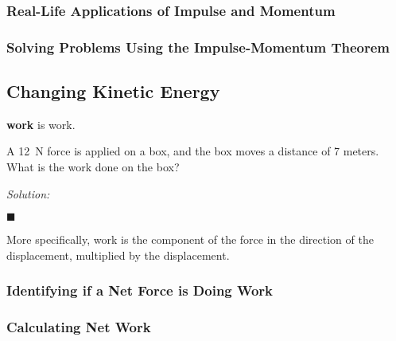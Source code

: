 \documentclass[dvipsnames]{article}
\begin{document}
\subsubsection{Real-Life Applications of Impulse and Momentum}

\subsubsection{Solving Problems Using the Impulse-Momentum Theorem}

\subsection{Changing Kinetic Energy}

\begin{center}
\end{center}

\textbf{\Gls{work}} is \glsdesc{work}.

\begin{example}
A \SI{12}{N} force is applied on a box, and the box moves a distance of 7 meters. What is the work done on the box?
\end{example}


\textit{Solution:}

\hfill $\blacksquare$

More specifically, work is the component of the force in the direction of the displacement, multiplied by the displacement.

\subsubsection{Identifying if a Net Force is Doing Work}

\subsubsection{Calculating Net Work}
\end{document}
